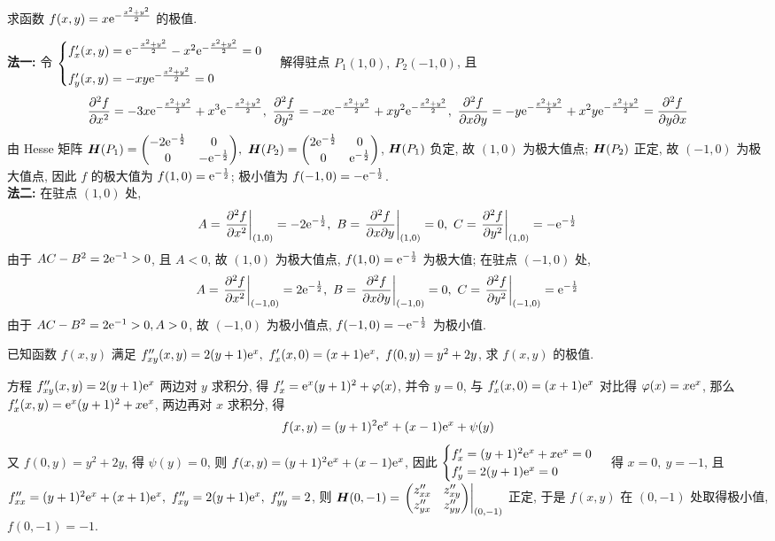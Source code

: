 \begin{example}[2012 数一]
    求函数 $f(x,y)=x\mathrm{e}^{-\frac{x^2+y^2}{2}}$ 的极值.
\end{example}
\begin{solution}
    \textbf{法一: }令 $\begin{cases}
        f_x'(x,y)=\mathrm{e}^{-\frac{x^2+y^2}{2}}-x^2\mathrm{e}^{-\frac{x^2+y^2}{2}}=0\\[6pt]
        f_y'(x,y)=-xy \mathrm{e}^{-\frac{x^2+y^2}{2}}=0
    \end{cases}$ 解得驻点 $P_1(1,0),~P_2(-1,0)$, 且 
    $$\pdv[2]{f}{x}=-3x\mathrm{e}^{-\frac{x^2+y^2}{2}}+x^3\mathrm{e}^{-\frac{x^2+y^2}{2}},~\pdv[2]{f}{y}=-x\mathrm{e}^{-\frac{x^2+y^2}{2}}+xy^2\mathrm{e}^{-\frac{x^2+y^2}{2}},~\pdv{f}{x}{y}=-y\mathrm{e}^{-\frac{x^2+y^2}{2}}+x^2y\mathrm{e}^{-\frac{x^2+y^2}{2}}=\pdv{f}{y}{x}$$
    由 Hesse 矩阵 $\vb*{H}(P_1)=\mqty(-2\e^{-\frac{1}{2}}&0\\0&-\e^{-\frac{1}{2}}),~\vb*{H}(P_2)=\mqty(2\e^{-\frac{1}{2}}&0\\0&\e^{-\frac{1}{2}})$, $\vb*{H}(P_1)$ 负定, 故 $(1,0)$ 为极大值点; $\vb*{H}(P_2)$ 正定, 故 $(-1,0)$ 为极大值点, 
    因此 $f$ 的极大值为 $f(1,0)=\mathrm{e}^{-\frac{1}{2}}$; 极小值为 $f(-1,0)=-\mathrm{e}^{-\frac{1}{2}}$.\\
    \textbf{法二: }在驻点 $ (1,0) $ 处, 
    $$A=\left.\frac{\partial^{2} f}{\partial x^{2}}\right|_{(1,0)}=-2 \mathrm{e}^{-\frac{1}{2}},~ B=\left.\frac{\partial^{2} f}{\partial x \partial y}\right|_{(1,0)}=0,~ C=\left.\frac{\partial^{2} f}{\partial y^{2}}\right|_{(1,0)}=-\mathrm{e}^{-\frac{1}{2}}  $$
    由于 $ A C-B^{2}=2 \mathrm{e}^{-1}>0 $, 且 $ A<0$, 故 $ (1,0) $ 为极大值点, $f(1,0)=\mathrm{e}^{-\frac{1}{2}} $ 为极大值; 在驻点 $ (-1,0) $ 处, 
    $$A=\left.\frac{\partial^{2} f}{\partial x^{2}}\right|_{(-1,0)}=2 \mathrm{e}^{-\frac{1}{2}},~ B=\left.\frac{\partial^{2} f}{\partial x \partial y}\right|_{(-1,0)}=0,~ C=\left.\frac{\partial^{2} f}{\partial y^{2}}\right|_{(-1,0)}=\mathrm{e}^{-\frac{1}{2}}$$
    由于 $ A C-B^{2}=2 \mathrm{e}^{-1}>0, A>0 $, 故 $ (-1,0) $ 为极小值点,  $f(-1,0)=-\mathrm{e}^{-\frac{1}{2}} $ 为极小值.
\end{solution}

\begin{example}[2015 数二]
    已知函数 $f(x,y)$ 满足 $f''_{xy}(x,y)=2(y+1)\mathrm{e}^x,~f'_x(x,0)=(x+1)\mathrm{e}^x,~f(0,y)=y^2+2y$, 求 $f(x,y)$ 的极值.
\end{example}
\begin{solution}
    方程 $f''_{xy}(x,y)=2(y+1)\mathrm{e}^x$ 两边对 $y$ 求积分, 得 $f'_x=\mathrm{e}^x(y+1)^2+\varphi(x)$, 并令 $y=0$, 与 $f'_x(x,0)=(x+1)\mathrm{e}^x$ 对比得 $\varphi(x)=x\mathrm{e} ^x$, 那么 
    $f'_x(x,y)=\mathrm{e}^x(y+1)^2+x\mathrm{e}^x$, 两边再对 $x$ 求积分, 得 $$f(x,y)=(y+1)^2\mathrm{e} ^x+(x-1)\mathrm{e} ^x+\psi(y)$$
    又 $f(0,y)=y^2+2y$, 得 $\psi(y)=0$, 则 $f(x,y)=(y+1)^2\mathrm{e} ^x+(x-1)\mathrm{e} ^x$, 
    因此 $\begin{cases}
        f'_x=(y+1)^2\mathrm{e} ^x+x\mathrm{e} ^x=0\\ 
        f'_y=2(y+1)\mathrm{e} ^x=0
    \end{cases}$ 得 $x=0,~y=-1$, 且 $f''_{xx}=(y+1)^2\mathrm{e} ^x+(x+1)\mathrm{e} ^x,~f''_{xy}=2(y+1)\mathrm{e} ^x,~f''_{yy}=2$, 则 $\vb*{H}(0,-1)=\eval{\mqty(z''_{xx}&z''_{xy}\\z''_{yx}&z''_{yy})}_{(0,-1)}$ 正定, 
    于是 $f(x,y)$ 在 $(0,-1)$ 处取得极小值, $f(0,-1)=-1.$
\end{solution}

